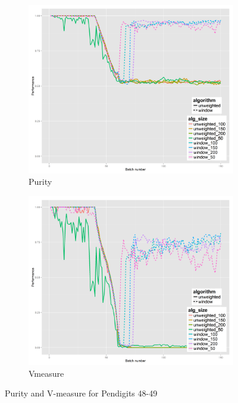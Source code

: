 \begin{figure}[!h]
        \centering
        \begin{subfigure}[b]{0.47\textwidth}
          \includegraphics[width=\textwidth]{standard_alt/ci_evolving_pen_48_49_standard_purity.png}         
                 \caption{Purity}
                 \label{fig:ps_4849}
        \end{subfigure}
        \begin{subfigure}[b]{0.47\textwidth}
          \includegraphics[width=\textwidth]{standard_alt/ci_evolving_pen_48_49_standard_vmeasure.png}
                 \caption{Vmeasure}
                 \label{fig:vs_4849}
        \end{subfigure}
\caption{Purity and V-measure for  Pendigits 48-49}
\label{fig:results_48-49}
\end{figure}

